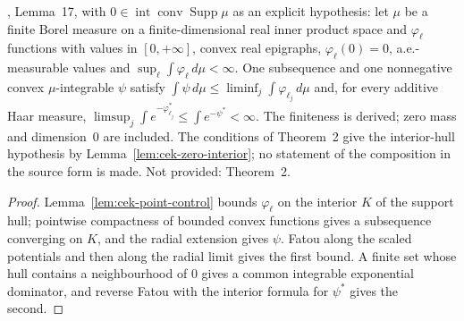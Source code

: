\begin{lemma}
  \label{lem:cek-compactness}
  \leanok
  \cite{CorderoKlartag2015}, Lemma~17, with $0\in\operatorname{int}\operatorname{conv}\operatorname{Supp}\mu$ as an explicit
  hypothesis: let $\mu$ be a finite Borel measure on a finite-dimensional real inner product space and $\varphi_\ell$ functions
  with values in $[0,+\infty]$, convex real epigraphs, $\varphi_\ell(0)=0$, a.e.-measurable values and
  $\sup_\ell\int\varphi_\ell\,d\mu<\infty$.  One subsequence and one nonnegative convex $\mu$-integrable $\psi$ satisfy
  $\int\psi\,d\mu\le\liminf_j\int\varphi_{\ell_j}\,d\mu$ and, for every additive Haar measure,
  $\limsup_j\int e^{-\varphi_{\ell_j}^*}\le\int e^{-\psi^*}<\infty$.  The finiteness is derived; zero mass and dimension~$0$
  are included.  The conditions of Theorem~2 give the interior-hull hypothesis by Lemma~\ref{lem:cek-zero-interior}; no
  statement of the composition in the source form is made.  Not provided: Theorem~2.
\end{lemma}
\begin{proof}
  \leanok
  Lemma~\ref{lem:cek-point-control} bounds $\varphi_\ell$ on the interior $K$ of the support hull; pointwise compactness of
  bounded convex functions gives a subsequence converging on $K$, and the radial extension gives $\psi$.  Fatou along the
  scaled potentials and then along the radial limit gives the first bound.  A finite set whose hull contains a neighbourhood
  of $0$ gives a common integrable exponential dominator, and reverse Fatou with the interior formula for $\psi^*$ gives the
  second.
\end{proof}


